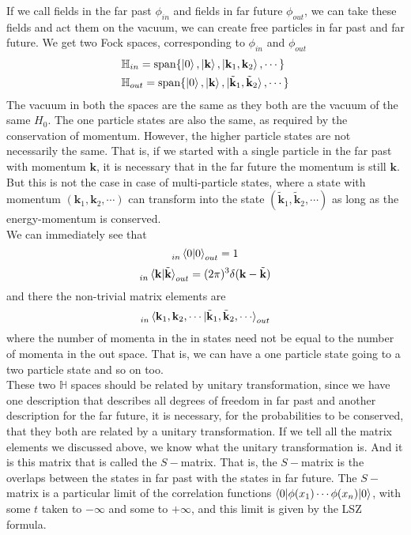 \documentclass[11pt, notitlepage]{report}
\numberwithin{equation}{section}
\begin{document}
    If we call fields in the far past \(\phi_{in}\) and fields in far future \(\phi_{out}\), we can take these fields and act them on the vacuum, we can create free particles in far past and far future. We get two Fock spaces, corresponding to \(\phi_{in}\) and \(\phi_{out}\)
    \begin{align*}
        &\mathbb{H}_{in} = \mathrm{span} \{ \ket{0}, \ket{\textbf{k}}, \ket{\textbf{k}_1, \textbf{k}_2}, \cdots \}\\
        &\mathbb{H}_{out} = \mathrm{span} \{ \ket{0}, \ket{\textbf{k}}, \ket{\tilde{\textbf{k}}_1, \tilde{\textbf{k}}_2}, \cdots \}
    \end{align*}
    The vacuum in both the spaces are the same as they both are the vacuum of the same \(H_0\). The one particle states are also the same, as required by the conservation of momentum. However, the higher particle states are not necessarily the same. That is, if we started with a single particle in the far past with momentum \(\textbf{k}\), it is necessary that in the far future the momentum is still \(\textbf{k}\). But this is not the case in case of multi-particle states, where a state with momentum \((\textbf{k}_1, \textbf{k}_2, \cdots)\) can transform into the state \((\tilde{\textbf{k}}_1, \tilde{\textbf{k}}_2, \cdots)\) as long as the energy-momentum is conserved. \\
    We can immediately see that 
    \begin{equation*}
        \indices{_{in}}\braket{0|0}_{out} = 1
    \end{equation*}
    \begin{equation*}
        \indices{_{in}}\braket{\textbf{k} | \tilde{\textbf{k}}}_{out} = (2\pi)^3\delta(\textbf{k} - \tilde{\textbf{k}})
    \end{equation*} 
    and there the non-trivial matrix elements are 
    \begin{equation*}
       \indices{_{in}}\braket{\textbf{k}_1, \textbf{k}_2, \cdots | \tilde{\textbf{k}}_1, \tilde{\textbf{k}}_2, \cdots}_{out}
    \end{equation*}
    where the number of momenta in the in states need not be equal to the number of momenta in the out space. That is, we can have a one particle state going to a two particle state and so on too. \\

    These two \(\mathbb{H}\) spaces should be related by unitary transformation, since we have one description that describes all degrees of freedom in far past and another description for the far future, it is necessary, for the probabilities to be conserved, that they both are related by a unitary transformation. If we tell all the matrix elements we discussed above, we know what the unitary transformation is. And it is this matrix that is called the \(S-\)matrix. That is, the \(S-\)matrix is the overlaps between the states in far past with the states in far future. The \(S-\)matrix is a particular limit of the correlation functions \(\braket{0|\phi(x_1) \cdots \phi(x_n)|0}\), with some \(t\) taken to \(-\infty\) and some to \(+\infty\), and this limit is given by the LSZ formula. \\
\end{document}
